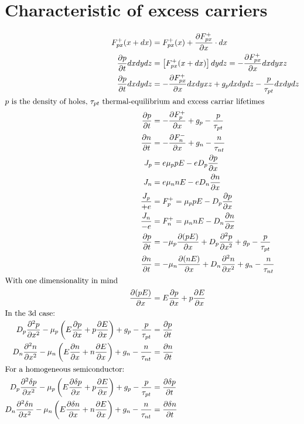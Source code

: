 \documentclass[article,oneside]{memoir}
\begin{document}
\chapter{Characteristic of excess carriers}
\begin{align*}
        F_{px}^+(x+dx)&=F_{px}^+(x)+ \frac{\partial F_{px}^+}{\partial x}\cdot dx\\
        \frac{\partial p}{\partial t}dxdydz&=\left[ F_{px}^+(x+dx) \right]dydz=-\frac{\partial F_{px}^+}{\partial x}dxdyxz\\
        \frac{\partial p}{\partial t}dxdydz&=-\frac{\partial F_{px}^+}{\partial x}dxdyxz + g_pdxdydz-\frac{p}{\tau_{pt}}dxdydz\\
        \intertext{$p$ is the density of holes, $\tau_{pt}$ thermal-equilibrium and excess carriar lifetimes}
        \frac{\partial p}{\partial t}&=-\frac{\partial F_{p}^+}{\partial x} + g_p-\frac{p}{\tau_{pt}}\\
        \frac{\partial n}{\partial t}&=-\frac{\partial F_{n}^-}{\partial x} + g_n-\frac{n}{\tau_{nt}}\\
        J_p&=e\mu_ppE-eD_p \frac{\partial p}{\partial x}\\
        J_n&=e\mu_nnE-eD_n \frac{\partial n}{\partial x}\\
        \frac{J_p}{+e}&=F_{p}^+=\mu_ppE-D_p \frac{\partial p}{\partial x}\\
        \frac{J_n}{-e}&=F_{n}^+=\mu_nnE-D_n \frac{\partial n}{\partial x}\\
        \frac{\partial p}{\partial t}&=-\mu_p \frac{\partial(pE)}{\partial x} + D_p \frac{\partial^2 p}{\partial x^2} + g_p-\frac{p}{\tau_{pt}}\\
        \frac{\partial n}{\partial t}&=-\mu_n \frac{\partial(nE)}{\partial x} + D_n \frac{\partial^2 n}{\partial x^2} + g_n-\frac{n}{\tau_{nt}}\\
        \intertext{With one dimensionality in mind}
        \frac{\partial(pE)}{\partial x}&=E \frac{\partial p}{\partial x} + p\frac{\partial E}{\partial x}\\
        \intertext{In the 3d case:}
        D_p \frac{\partial^2 p}{\partial x^2}- \mu_p \left( E \frac{\partial p}{\partial x} + p \frac{\partial E}{\partial x} \right)+g_p-\frac{p}{\tau_{pt}}&=\frac{\partial p}{\partial t}\\
        D_n \frac{\partial^2 n}{\partial x^2}- \mu_n \left( E \frac{\partial n}{\partial x} + n \frac{\partial E}{\partial x} \right)+g_n-\frac{n}{\tau_{nt}}&=\frac{\partial n}{\partial t}\\
        \intertext{For a homogeneous semiconductor:}
        D_p \frac{\partial^2 \delta p}{\partial x^2}- \mu_p \left( E \frac{\partial \delta p}{\partial x} + p \frac{\partial E}{\partial x} \right)+g_p-\frac{p}{\tau_{pt}}&=\frac{\partial \delta p}{\partial t}\\
        D_n \frac{\partial^2 \delta n}{\partial x^2}- \mu_n \left( E \frac{\partial \delta n}{\partial x} + n \frac{\partial E}{\partial x} \right)+g_n-\frac{n}{\tau_{nt}}&=\frac{\partial \delta n}{\partial t}\\
\end{align*}
\end{document}
